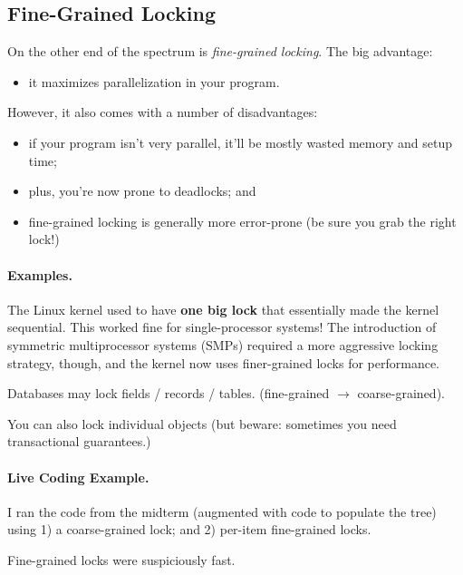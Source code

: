 \documentclass[11pt]{article}
\newenvironment{itemizep}{
 \begin{itemize}
  \setlength{\itemsep}{0pt}
  \setlength{\parsep}{3pt}
  \setlength{\topsep}{3pt}
  \setlength{\partopsep}{0pt}
  \setlength{\leftmargin}{1.5em}
  \setlength{\labelwidth}{1em}
  \setlength{\labelsep}{0.5em} }
 {\end{itemize}}
\begin{document}
\subsection*{Fine-Grained Locking}
On the other end of the spectrum is \emph{fine-grained locking}. The big
advantage:
  \begin{itemizep}
    \item it maximizes parallelization in your program.
  \end{itemizep}

However, it also comes with a number of disadvantages:
  \begin{itemizep}
    \item if your program isn't very parallel, it'll be mostly wasted memory and setup time;
    \item plus, you're now prone to deadlocks; and
    \item fine-grained locking is generally more error-prone (be sure you grab the right lock!)
  \end{itemizep}

\paragraph{Examples.}
    The Linux kernel used to have {\bf one big lock} that essentially
    made the kernel sequential.  This worked fine for single-processor
    systems!  The introduction of symmetric multiprocessor systems
    (SMPs) required a more aggressive locking strategy, though, and
    the kernel now uses finer-grained locks for performance.

    Databases may lock fields / records / tables. (fine-grained $\rightarrow$ coarse-grained).

    You can also lock individual objects (but beware: sometimes you need transactional guarantees.)

\paragraph{Live Coding Example.} I ran the code from the midterm (augmented with
code to populate the tree) using 1) a coarse-grained lock; and 2)
per-item fine-grained locks.

Fine-grained locks were suspiciously fast.
\end{document}
